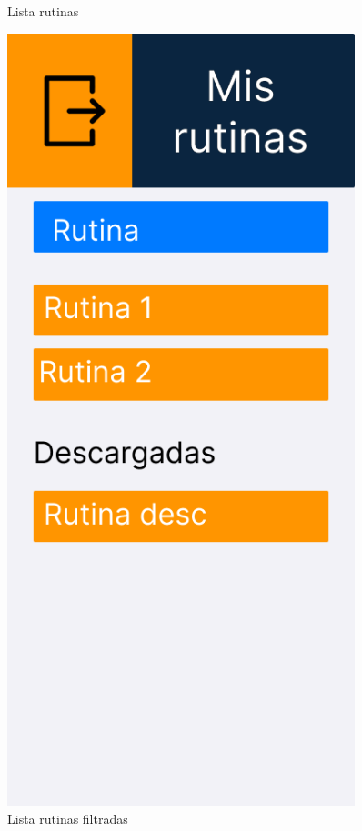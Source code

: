 \begin{figure}[H]
\begin{minipage}{0.45\textwidth}
      \caption{Lista rutinas}
      \label{fig:Lista rutinas}
   \end{minipage}%
   \hspace{0.5cm}
   \begin{minipage}{0.45\textwidth}
      \centering
      \includegraphics[width=0.9\textwidth]{fotos/Frame 47.png}
      \caption{Lista rutinas filtradas}
      \label{fig:Lista rutinas filtradas}
   \end{minipage}
\end{figure}

